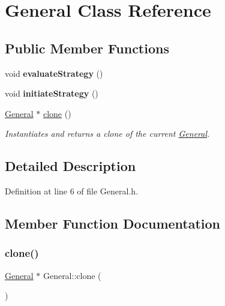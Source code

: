 \hypertarget{classGeneral}{}\section{General Class Reference}
\label{classGeneral}
\subsection*{Public Member Functions}
\begin{DoxyCompactItemize}
\item 
\mbox{\label{classGeneral_af4bee805ca5f7756c6d1f1c3fcde862a}} 
void {\bfseries evaluate\+Strategy} ()
\item 
\mbox{\label{classGeneral_a449172bcf1b4bf8b9a47af6b4e435d7e}} 
void {\bfseries initiate\+Strategy} ()
\item 
\hyperlink{classGeneral}{General} $\ast$ \hyperlink{classGeneral_a6c73103d464cf8f3ed95deea76d788d5}{clone} ()
\begin{DoxyCompactList}\small\item\em Instantiates and returns a clone of the current \hyperlink{classGeneral}{General}. \end{DoxyCompactList}\end{DoxyCompactItemize}


\subsection{Detailed Description}


Definition at line 6 of file General.\+h.



\subsection{Member Function Documentation}
\mbox{\label{classGeneral_a6c73103d464cf8f3ed95deea76d788d5}} 
\subsubsection{\texorpdfstring{clone()}{clone()}}
{\footnotesize\ttfamily \hyperlink{classGeneral}{General} $\ast$ General\+::clone (\begin{DoxyParamCaption}{ }\end{DoxyParamCaption})}



